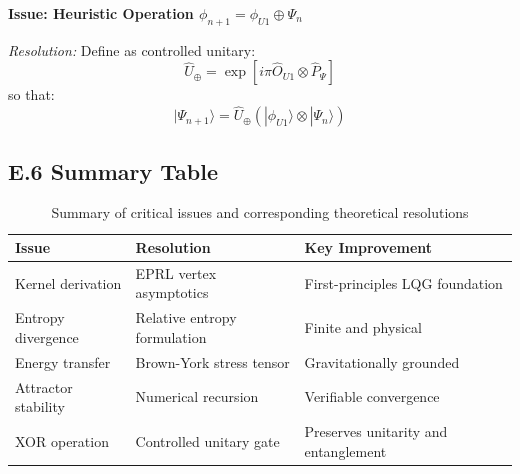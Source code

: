 \textbf{Issue: Heuristic Operation $\phi_{n+1} = \phi_{U1} \oplus \Psi_n$}

\textit{Resolution:}  
Define as controlled unitary:
\[
\hat{U}_\oplus = \exp[i\pi \hat{O}_{U1} \otimes \hat{P}_\Psi]
\]
so that:
\[
|\Psi_{n+1}\rangle = \hat{U}_\oplus \left(|\phi_{U1}\rangle \otimes |\Psi_n\rangle\right)
\]

\subsection*{E.6 Summary Table}

\begin{table}[H]
\centering
\begin{tabular}{|l|l|l|}
\hline
\textbf{Issue} & \textbf{Resolution} & \textbf{Key Improvement} \\
\hline
Kernel derivation & EPRL vertex asymptotics & First-principles LQG foundation \\
Entropy divergence & Relative entropy formulation & Finite and physical \\
Energy transfer & Brown-York stress tensor & Gravitationally grounded \\
Attractor stability & Numerical recursion & Verifiable convergence \\
XOR operation & Controlled unitary gate & Preserves unitarity and entanglement \\
\hline
\end{tabular}
\caption{Summary of critical issues and corresponding theoretical resolutions}
\end{table}
